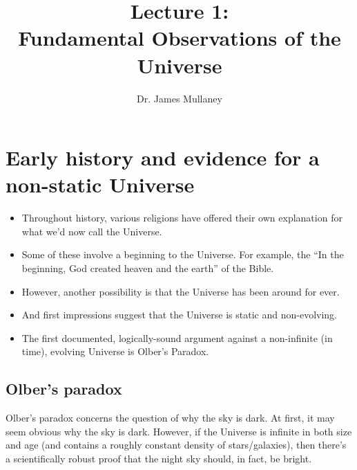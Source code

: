\documentclass[11pt]{article}
\begin{document}
 
\title{Lecture 1:\\Fundamental Observations of the Universe}
\author{Dr. James Mullaney}
\maketitle

\section{Early history and evidence for a non-static Universe}
\begin{itemize}
\item Throughout history, various religions have offered their own explanation for what we'd now call the Universe.
\item Some of these involve a beginning to the Universe. For example, the ``In the beginning, God created heaven and the earth'' of the Bible.
\item However, another possibility is that the Universe has been around for ever.
\item And first impressions suggest that the Universe is static and non-evolving.
\item The first documented, logically-sound argument against a non-infinite (in time), evolving Universe is Olber's Paradox.
\end{itemize}

\subsection{Olber's paradox}
Olber's paradox concerns the question of why the sky is dark. At
first, it may seem obvious why the sky is dark. However, if the
Universe is infinite in both size and age (and contains a roughly
constant density of stars/galaxies), then there's a scientifically robust proof that the night sky should, in fact, be bright.
\vspace{3mm}
\end{document}
